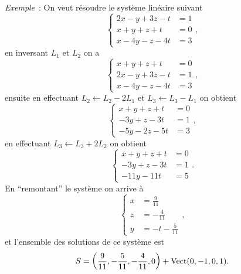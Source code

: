   \emph{Exemple}~: On veut résoudre le système linéaire suivant
  \begin{equation}
    \begin{cases}
      2x-y+3z-t& = 1\\
      x+y+z+t& = 0\\
      x-4y-z-4t& = 3
    \end{cases},
  \end{equation}
  en inversant \(L_1\) et \(L_2\) on a
  \begin{equation}
    \begin{cases} x+y+z+t& = 0\\
      2x-y+3z-t& = 1\\
      x-4y-z-4t& = 3
    \end{cases},
    \end{equation}
    ensuite en effectuant \(L_2 \leftarrow L_2-2L_1\) et \(L_3 \leftarrow 
    L_3-L_1\) on obtient
    \begin{equation}
      \begin{cases} x+y+z+t& = 0\\
        -3y+z-3t& = 1\\
        -5y-2z-5t& = 3
      \end{cases},
      \end{equation}
      en effectuant \(L_3 \leftarrow L_3+2L_2\) on obtient
      \begin{equation}
        \begin{cases} x+y+z+t& = 0\\
          -3y+z-3t& = 1\\
          -11y-11t& = 5
        \end{cases}.
        \end{equation}
        En ``remontant'' le système on arrive à
        \begin{equation}
          \begin{cases}
            x &= \frac{9}{11} \\
            z &= -\frac{4}{11}\\
            y &= -t -\frac{5}{11}
          \end{cases},
        \end{equation}
        et l'ensemble des solutions de ce système est
        \begin{equation}
          S = \left(\frac{9}{11}, -\frac{5}{11}, -\frac{4}{11}, 0\right) + 
          \operatorname{Vect}(0,-1,0,1).
        \end{equation}
